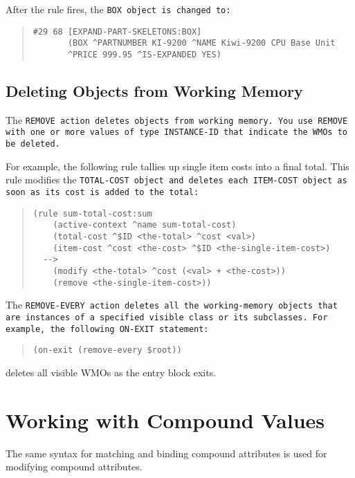 After the rule fires, the \tt{BOX} object is changed to:

\begin{quote}
\begin{verbatim}
#29 68 [EXPAND-PART-SKELETONS:BOX] 
       (BOX ^PARTNUMBER KI-9200 ^NAME Kiwi-9200 CPU Base Unit 
       ^PRICE 999.95 ^IS-EXPANDED YES)
\end{verbatim}
\end{quote}

\subsection{Deleting Objects from Working Memory}

The \tt{REMOVE} action deletes objects from working memory. You use
\tt{REMOVE} with one or more values of type \tt{INSTANCE-ID} that
indicate the WMOs to be deleted.

For example, the following rule tallies up single item costs into a
final total. This rule modifies the \tt{TOTAL-COST} object and deletes
each \tt{ITEM-COST} object as soon as its cost is added to the total:

\begin{quote}
\begin{verbatim}
(rule sum-total-cost:sum
    (active-context ^name sum-total-cost)
    (total-cost ^$ID <the-total> ^cost <val>)
    (item-cost ^cost <the-cost> ^$ID <the-single-item-cost>)
  -->
    (modify <the-total> ^cost (<val> + <the-cost>))
    (remove <the-single-item-cost>))
\end{verbatim}
\end{quote}

The \tt{REMOVE-EVERY} action deletes all the working-memory objects
that are instances of a specified visible class or its subclasses. For
example, the following \tt{ON-EXIT} statement:

\begin{quote}
\begin{verbatim}
(on-exit (remove-every $root))
\end{verbatim}
\end{quote}

deletes all visible WMOs as the entry block exits.

\section{Working with Compound Values}

The same syntax for matching and binding compound attributes is used
for modifying compound attributes.

